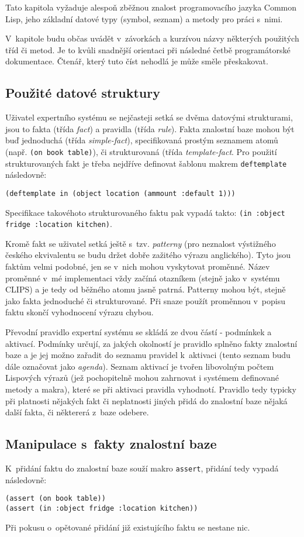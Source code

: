 \documentclass[a4paper,12pt]{article}
\begin{document}
Tato kapitola vyžaduje alespoň zběžnou znalost programovacího jazyka
Common Lisp, jeho základní datové typy (symbol, seznam) a metody pro
práci s~nimi.

V~kapitole budu občas uvádět v~závorkách a kurzívou názvy některých použitých
tříd či metod. Je to kvůli snadnější orientaci při následné četbě programátorské
dokumentace. Čtenář, který tuto číst nehodlá je může směle přeskakovat.

\subsection{Použité datové struktury}
Uživatel expertního systému se nejčasteji setká se dvěma datovými strukturami,
jsou to fakta (třída \emph{fact}) a pravidla (třída \emph{rule}). Fakta znalostní
baze mohou být buď jednoduchá (třída \emph{simple-fact}), specifikovaná prostým
seznamem atomů (např. \verb|(on book table)|), či strukturovaná (třída
\emph{template-fact}. Pro použití strukturovaných fakt je třeba nejdříve definovat
šablonu makrem \verb|deftemplate| následovně:
\begin{verbatim}
(deftemplate in (object location (ammount :default 1)))
\end{verbatim}
Specifikace takovéhoto strukturovaného faktu pak vypadá takto:
\verb|(in :object fridge :location kitchen)|.

Kromě fakt se uživatel setká ještě s~tzv. \emph{patterny} (pro neznalost
výstižného českého ekvivalentu se budu držet dobře zažitého výrazu anglického).
Tyto jsou faktům velmi podobné, jen se v~nich mohou vyskytovat proměnné.
Název proměnné v~mé implementaci vždy začíná otazníkem (stejně jako v~systému
CLIPS) a je tedy od běžného atomu jasně patrná. Patterny mohou být, stejně
jako fakta jednoduché či strukturované. Při snaze použít proměnnou v~popisu
faktu skončí vyhodnocení výrazu chybou.

Převodní pravidlo expertní systému se skládá ze dvou částí - podmínkek
a aktivací. Podmínky určují, za jakých okolností je pravidlo splněno
fakty znalostní baze a je jej možno zařadit do seznamu pravidel k~aktivaci
(tento seznam budu dále označovat jako \emph{agenda}). Seznam aktivací
je tvořen libovolným počtem Lispových výrazů (jež pochopitelně mohou
zahrnovat i systémem definované metody a makra), které se při aktivaci
pravidla vyhodnotí. Pravidlo tedy typicky při platnosti nějakých fakt
či neplatnosti jiných přidá do znalostní baze nějaká další fakta, či
některerá z~baze odebere.

\subsection{Manipulace s~fakty znalostní baze}
K~přidání faktu do znalostní baze souží makro \verb|assert|, přidání tedy
vypadá následovně:
\begin{verbatim}
(assert (on book table))
(assert (in :object fridge :location kitchen))
\end{verbatim}
Při pokusu o~opětované přidání již existujícího faktu se nestane nic.
\end{document}
